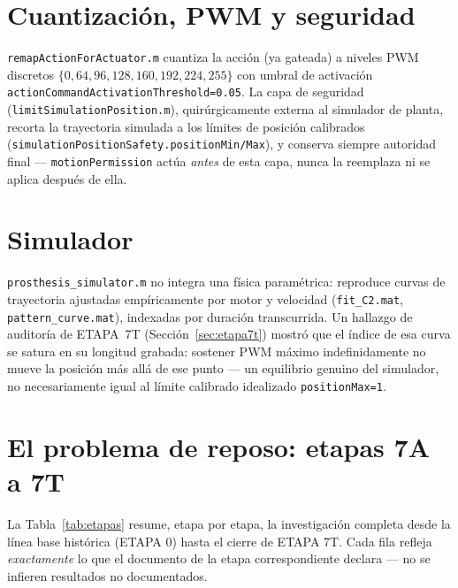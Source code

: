\documentclass[11pt,a4paper]{article}
\begin{document}
\section{Cuantización, PWM y seguridad}

\texttt{remapActionForActuator.m} cuantiza la acción (ya gateada) a niveles PWM
discretos $\{0,64,96,128,160,192,224,255\}$ con umbral de activación
\texttt{actionCommandActivationThreshold=0.05}. La capa de seguridad
(\texttt{limitSimulationPosition.m}), quirúrgicamente externa al simulador de planta,
recorta la trayectoria simulada a los límites de posición calibrados
(\texttt{simulationPositionSafety.positionMin/Max}), y conserva siempre autoridad
final --- \texttt{motionPermission} actúa \emph{antes} de esta capa, nunca la
reemplaza ni se aplica después de ella.

\section{Simulador}

\texttt{prosthesis\_simulator.m} no integra una física paramétrica: reproduce curvas de
trayectoria ajustadas empíricamente por motor y velocidad (\texttt{fit\_C2.mat},
\texttt{pattern\_curve.mat}), indexadas por duración transcurrida. Un hallazgo de
auditoría de ETAPA~7T (Sección~\ref{sec:etapa7t}) mostró que el índice de esa curva se
satura en su longitud grabada: sostener PWM máximo indefinidamente no mueve la posición
más allá de ese punto --- un equilibrio genuino del simulador, no necesariamente igual
al límite calibrado idealizado \texttt{positionMax=1}.

\section{El problema de reposo: etapas 7A a 7T}

La Tabla~\ref{tab:etapas} resume, etapa por etapa, la investigación completa desde la
línea base histórica (ETAPA 0) hasta el cierre de ETAPA 7T. Cada fila refleja
\emph{exactamente} lo que el documento de la etapa correspondiente declara --- no se
infieren resultados no documentados.
\end{document}
